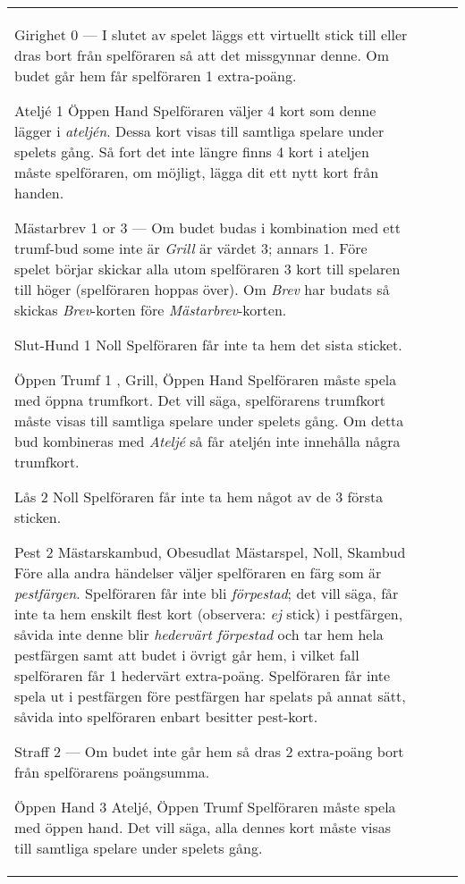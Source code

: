 \begin{table}
\begin{center}
\begin{tabularx}{\textwidth}{
			l
			S[table-number-alignment=center, table-format=1.0]
			p{3cm}
			|X
		}
			\specialBidItem%
			{Girighet}
			{0}
			{---}
			{%
				I slutet av spelet läggs ett virtuellt stick till eller dras bort från spelföraren så att det missgynnar denne. Om budet går hem får spelföraren 1 extra-poäng.
			}

			\specialBidItem%
			{Ateljé}
			{1}
			{Öppen Hand}
			{%
				Spelföraren väljer 4 kort som denne lägger i \emph{ateljén}. Dessa kort visas till samtliga spelare under spelets gång. Så fort det inte längre finns 4 kort i ateljen måste spelföraren, om möjligt, lägga dit ett nytt kort från handen.
			}

			\specialBidItem%
			{Mästarbrev}
			{{1 or 3}}
			{---}
			{%
				Om budet budas i kombination med ett trumf-bud some inte är \emph{Grill} är värdet 3; annars 1. Före spelet börjar skickar alla utom spelföraren 3 kort till spelaren till höger (spelföraren hoppas över). Om \emph{Brev} har budats så skickas \emph{Brev}-korten före \emph{Mästarbrev}-korten.
			}

			\specialBidItem%
			{Slut-Hund}
			{1}
			{Noll}
			{%
				Spelföraren får inte ta hem det sista sticket.
			}

			\specialBidItem%
			{Öppen Trumf}
			{1}
			{\nonTrump, Grill, Öppen Hand}
			{%
				Spelföraren måste spela med öppna trumfkort. Det vill säga, spelförarens trumfkort måste visas till samtliga spelare under spelets gång. Om detta bud kombineras med \emph{Ateljé} så får ateljén inte innehålla några trumfkort.
			}

			\specialBidItem%
			{Lås}
			{2}
			{Noll}
			{%
				Spelföraren får inte ta hem något av de 3 första sticken.
			}

			\specialBidItem%
			{Pest}
			{2}
			{Mästarskambud, Obesudlat Mästarspel, Noll, Skambud}
			{%
				Före alla andra händelser väljer spelföraren en färg som är \emph{pestfärgen}. Spelföraren får inte bli \emph{förpestad}; det vill säga, får inte ta hem enskilt flest kort (observera: \emph{ej} stick) i pestfärgen, såvida inte denne blir \emph{hedervärt förpestad} och tar hem hela pestfärgen samt att budet i övrigt går hem, i vilket fall spelföraren får 1 hedervärt extra-poäng. Spelföraren får inte spela ut i pestfärgen före pestfärgen har spelats på annat sätt, såvida into spelföraren enbart besitter pest-kort.
			}

			\specialBidItem%
			{Straff}
			{2}
			{---}
			{%
				Om budet inte går hem så dras 2 extra-poäng bort från spelförarens poängsumma.
			}

			\specialBidItem%
			{Öppen Hand}
			{3}
			{Ateljé, Öppen Trumf}
			{%
				Spelföraren måste spela med öppen hand. Det vill säga, alla dennes kort måste visas till samtliga spelare under spelets gång.
			}
		\end{tabularx}
	\end{center}
\end{table}
